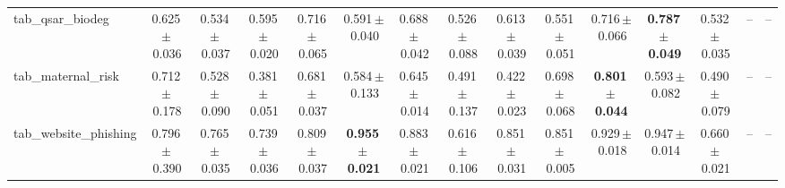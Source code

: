 \documentclass[8pt]{extarticle}
\begin{document}
\begin{longtable}{l*{14}{c}}
tab\_qsar\_biodeg & 0.625\,$\pm$\,0.036 & 0.534\,$\pm$\,0.037 & 0.595\,$\pm$\,0.020 & 0.716\,$\pm$\,0.065 & 0.591\,$\pm$\,0.040 & 0.688\,$\pm$\,0.042 & 0.526\,$\pm$\,0.088 & 0.613\,$\pm$\,0.039 & 0.551\,$\pm$\,0.051 & 0.716\,$\pm$\,0.066 & \textbf{0.787\,$\pm$\,0.049} & 0.532\,$\pm$\,0.035 & -- & -- \\
tab\_maternal\_risk & 0.712\,$\pm$\,0.178 & 0.528\,$\pm$\,0.090 & 0.381\,$\pm$\,0.051 & 0.681\,$\pm$\,0.037 & 0.584\,$\pm$\,0.133 & 0.645\,$\pm$\,0.014 & 0.491\,$\pm$\,0.137 & 0.422\,$\pm$\,0.023 & 0.698\,$\pm$\,0.068 & \textbf{0.801\,$\pm$\,0.044} & 0.593\,$\pm$\,0.082 & 0.490\,$\pm$\,0.079 & -- & -- \\
tab\_website\_phishing & 0.796\,$\pm$\,0.390 & 0.765\,$\pm$\,0.035 & 0.739\,$\pm$\,0.036 & 0.809\,$\pm$\,0.037 & \textbf{0.955\,$\pm$\,0.021} & 0.883\,$\pm$\,0.021 & 0.616\,$\pm$\,0.106 & 0.851\,$\pm$\,0.031 & 0.851\,$\pm$\,0.005 & 0.929\,$\pm$\,0.018 & 0.947\,$\pm$\,0.014 & 0.660\,$\pm$\,0.021 & -- & -- \\
\end{longtable}
\end{document}
